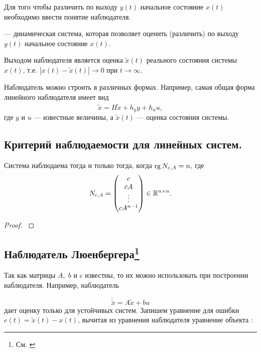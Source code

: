 \documentclass[../../TAU.tex]{subfiles}
\begin{document}
    Для того чтобы различить по выходу $y(t)$ начальное состояние $x(t)$ необходимо ввести понятие наблюдателя.

     --- динамическая система, которая позволяет оценить (различить) по выходу $y(t)$ начальное состояние $x(t)$.

    Выходом наблюдателя является оценка $\tilde x(t)$ реального состояния системы $x(t)$, т.е. $|x(t)-\tilde x(t)|\rightarrow 0$ при $t\rightarrow\infty$.

    Наблюдатель можно строить в различных формах. Например, самая общая форма линейного наблюдателя имеет вид
    $$
    \dot{\tilde x} = H\tilde x + h_y y + h_u u,
    $$
    где $y$ и $u$ --- известные величины, а $\tilde x (t)$ --- оценка состояния системы.

\subsection{Критерий наблюдаемости для линейных систем.}

    \begin{theor}
        Система  наблюдаема тогда и только тогда, когда $\mathop{\mathrm{rg}}\nolimits N_{c,A} = n$, где
        $$
            N_{c,A} =
            \begin{pmatrix}
                c\\
                cA\\
                \vdots\\
                cA^{n-1}
            \end{pmatrix}
            \in\mathbb{R}^{n\times n}.
        $$
    \end{theor}
    
    \begin{proof}
    \cite[стр. 315-318]{voron2}
    \end{proof}

\subsection[Наблюдатель Люенбергера]{Наблюдатель Люенбергера\footnote{См. \cite[стр. 119]{andr}}}

    Так как матрицы $A,\; b$ и $c$ известны, то их можно использовать при построении наблюдателя. Например, наблюдатель

    $$
        \dot{\tilde x} = A\tilde x + bu
    $$
    дает оценку только для устойчивых систем. Запишем уравнение для ошибки $e(t) = \tilde x (t) - x(t)$, вычитая из уравнения наблюдателя уравнение объекта :
\end{document}
